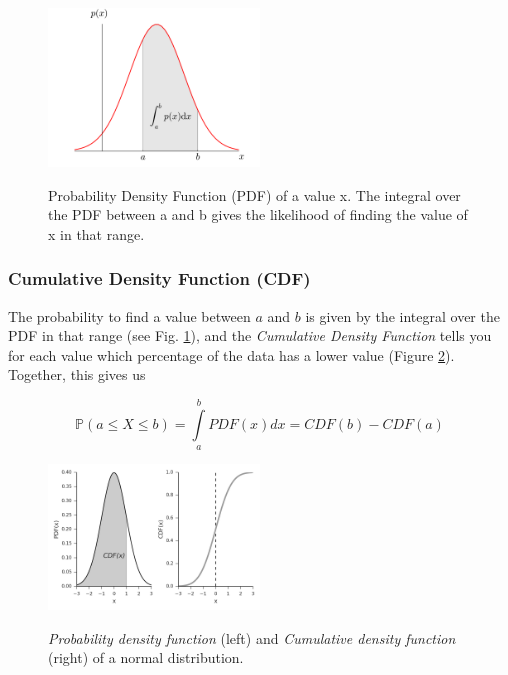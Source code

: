 \begin{figure}
  \centering
  \includegraphics[width=0.5\textwidth]{../Images/PDF.png}\\
  \caption{Probability Density Function (PDF) of a value x. The integral over the PDF between a and b gives the likelihood of finding the value of x in that range.}\label{fig:PDF}
\end{figure}

\subsubsection{Cumulative Density Function (CDF)}

The probability to find a value between $a$ and $b$ is given by the integral over the PDF in that range (see Fig. \ref{fig:PDF}), and the \emph{Cumulative Density Function} tells you for each value which percentage of the data has a lower value (Figure \ref{fig:CDF}). Together, this gives us

\begin{equation}
   \mathbb{P}(a \leq X \leq b) = \int\limits_a^b {PDF(x)dx} = CDF(b) - CDF(a)
\end{equation}


\begin{figure}[ht]
  \centering
  \includegraphics[width=0.5\textwidth]{../Images/PDF_CDF.png}\\
  \caption{\emph{Probability density function} (left) and \emph{Cumulative density function} (right) of a normal distribution.}\label{fig:CDF}
\end{figure}

